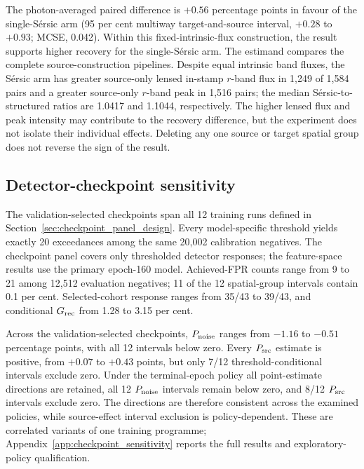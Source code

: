 The photon-averaged paired difference is \(+0.56\) percentage points in
favour of the single-S\'{e}rsic arm (95 per cent multiway target-and-source
interval, \(+0.28\) to \(+0.93\); MCSE, 0.042). Within this
fixed-intrinsic-flux construction, the result supports higher recovery for the
single-S\'{e}rsic arm. The estimand compares the complete source-construction
pipelines. Despite equal intrinsic band fluxes, the
S\'{e}rsic arm has greater source-only lensed in-stamp \(r\)-band flux in
1,249 of 1,584 pairs and a greater source-only \(r\)-band peak in 1,516 pairs;
the median S\'{e}rsic-to-structured ratios are 1.0417 and 1.1044,
respectively. The higher lensed flux and peak intensity may contribute to the
recovery difference, but the experiment does not isolate their individual
effects. Deleting any one source or target spatial group does not reverse the
sign of the result.

\subsection{Detector-checkpoint sensitivity}
\label{sec:checkpoint_sensitivity_results}

The validation-selected checkpoints span all 12 training runs defined in
Section~\ref{sec:checkpoint_panel_design}. Every model-specific threshold
yields exactly 20 exceedances among the same 20,002 calibration negatives.
The checkpoint panel covers only thresholded detector responses; the
feature-space results use the primary epoch-160 model.
Achieved-FPR counts range from 9 to 21 among 12,512 evaluation negatives; 11
of the 12 spatial-group intervals contain 0.1 per cent. Selected-cohort
response ranges from 35/43 to 39/43, and conditional \(G_{\rm rec}\) from
1.28 to 3.15 per cent.

Across the validation-selected checkpoints, \(P_{\rm noise}\) ranges from
\(-1.16\) to \(-0.51\) percentage points, with all 12 intervals below zero.
Every \(P_{\rm src}\) estimate is positive, from \(+0.07\) to \(+0.43\)
points, but only 7/12 threshold-conditional intervals exclude zero. Under the
terminal-epoch policy all point-estimate directions are retained, all 12
\(P_{\rm noise}\) intervals remain below zero, and 8/12 \(P_{\rm src}\)
intervals exclude zero. The directions are therefore consistent across the
examined policies, while source-effect interval exclusion is policy-dependent.
These are correlated variants of one training programme;
Appendix~\ref{app:checkpoint_sensitivity} reports the full results and
exploratory-policy qualification.

